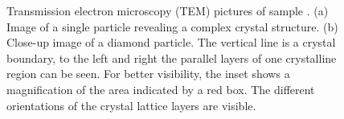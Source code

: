 \begin{figure}[!htb]
\begin{subfigure}{ 0.49\linewidth}
						\caption{}
						\label{subfig::tem_boundary}
					\end{subfigure}
					\caption[\TEM imaging of a single \nd]{Transmission electron microscopy (TEM) pictures of sample \insituH. (a) Image of a single \nd particle revealing a complex crystal structure. (b) Close-up image of a diamond particle. The vertical line is a crystal boundary, to the left and right the parallel layers of one crystalline region can be seen. For better visibility, the inset shows a magnification of the area indicated by a red box. The different orientations of the crystal lattice layers are visible.}
					\label{fig::tem}
				\end{figure}
